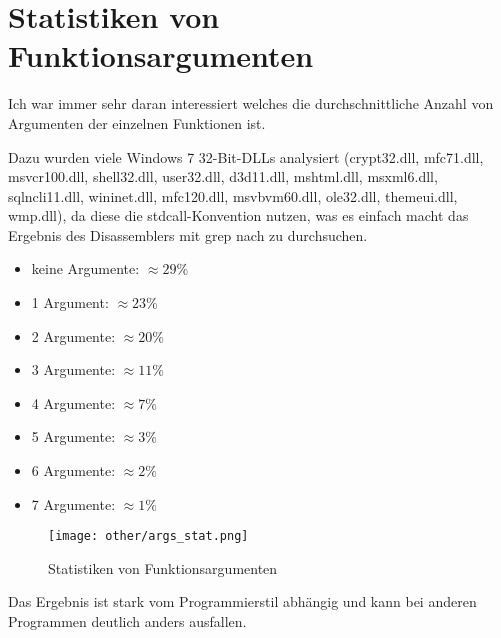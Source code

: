 \section{Statistiken von Funktionsargumenten}
\label{args_stat}

Ich war immer sehr daran interessiert welches die durchschnittliche Anzahl von
Argumenten der einzelnen Funktionen ist.

Dazu wurden viele Windows 7 32-Bit-DLLs analysiert
(crypt32.dll, mfc71.dll, msvcr100.dll, shell32.dll, user32.dll, d3d11.dll, mshtml.dll,
msxml6.dll, sqlncli11.dll, wininet.dll, mfc120.dll, msvbvm60.dll, ole32.dll, themeui.dll,
wmp.dll), da diese die stdcall-Konvention nutzen, was es einfach macht das Ergebnis des
Disassemblers mit grep nach  zu durchsuchen.

\begin{itemize}
\item keine Argumente: $\approx 29\%$
\item 1 Argument: $\approx 23\%$
\item 2 Argumente: $\approx 20\%$
\item 3 Argumente: $\approx 11\%$
\item 4 Argumente: $\approx 7\%$
\item 5 Argumente: $\approx 3\%$
\item 6 Argumente: $\approx 2\%$
\item 7 Argumente: $\approx 1\%$
\end{itemize}

\begin{figure}[H]
\centering
\texttt{[image: other/args\_stat.png]}
\caption{Statistiken von Funktionsargumenten}
\end{figure}

Das Ergebnis ist stark vom Programmierstil abhängig und kann bei anderen Programmen
deutlich anders ausfallen.

